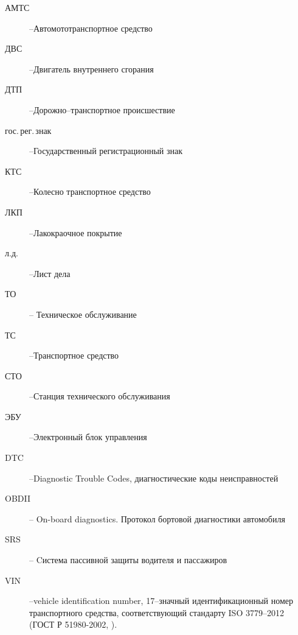 \begin{description}
	\item[АМТС] --Автомототранспортное средство
	\item[ДВС] --Двигатель внутреннего сгорания
	\item[ДТП] --Дорожно--транспортное происшествие
	\item[гос.\,рег.\,знак] --Государственный регистрационный знак
	\item[КТС] --Колесно транспортное средство 
	\item[ЛКП] --Лакокраочное покрытие
	\item[л.д.] --Лист дела
	\item[ТО] -- Техническое обслуживание
	\item[ТС] --Транспортное средство
	\item[СТО] --Станция технического обслуживания
	\item[ЭБУ] --Электронный блок управления
	\item[DTC] --Diagnostic Trouble Codes, диагностические коды неисправностей
	\item[OBDII] -- On-board diagnostics. Протокол бортовой диагностики автомобиля
	\item[SRS] -- Cистема пассивной защиты водителя и пассажиров
	\item[VIN] --vehicle identification number, 17--значный идентификационный номер транспортного средства, соответствующий стандарту ISO 3779--2012 (ГОСТ Р 51980-2002, \cite{51980:gost}).
\end{description}